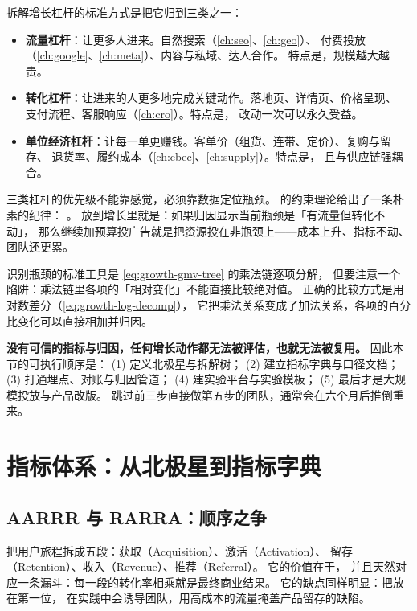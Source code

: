 拆解增长杠杆的标准方式是把它归到三类之一：

\begin{itemize}
  \item \textbf{流量杠杆}：让更多人进来。自然搜索（\cref{ch:seo}、\cref{ch:geo}）、
        付费投放（\cref{ch:google}、\cref{ch:meta}）、内容与私域、达人合作。
        特点是，规模越大越贵。
  \item \textbf{转化杠杆}：让进来的人更多地完成关键动作。落地页、详情页、价格呈现、
        支付流程、客服响应（\cref{ch:cro}）。特点是，
        改动一次可以永久受益。
  \item \textbf{单位经济杠杆}：让每一单更赚钱。客单价（组货、连带、定价）、复购与留存、
        退货率、履约成本（\cref{ch:cbec}、\cref{ch:supply}）。特点是，
        且与供应链强耦合。
\end{itemize}

三类杠杆的优先级不能靠感觉，必须靠数据定位瓶颈。
\cite{goldratt2004goal} 的约束理论给出了一条朴素的纪律：
。
放到增长里就是：如果归因显示当前瓶颈是「有流量但转化不动」，
那么继续加预算投广告就是把资源投在非瓶颈上——成本上升、指标不动、团队还更累。

识别瓶颈的标准工具是 \cref{eq:growth-gmv-tree} 的乘法链逐项分解，
但要注意一个陷阱：乘法链里各项的「相对变化」不能直接比较绝对值。
正确的比较方式是用对数差分（\cref{eq:growth-log-decomp}），
它把乘法关系变成了加法关系，各项的百分比变化可以直接相加并归因。

\begin{keypoint}
\textbf{没有可信的指标与归因，任何增长动作都无法被评估，也就无法被复用。}
因此本节的可执行顺序是：
(1) 定义北极星与拆解树；
(2) 建立指标字典与口径文档；
(3) 打通埋点、对账与归因管道；
(4) 建实验平台与实验模板；
(5) 最后才是大规模投放与产品改版。
跳过前三步直接做第五步的团队，通常会在六个月后推倒重来。
\end{keypoint}

\section{指标体系：从北极星到指标字典}

\subsection{AARRR 与 RARRA：顺序之争}

 把用户旅程拆成五段：获取（Acquisition）、激活（Activation）、
留存（Retention）、收入（Revenue）、推荐（Referral）。
它的价值在于，
并且天然对应一条漏斗：每一段的转化率相乘就是最终商业结果。
它的缺点同样明显：把放在第一位，
在实践中会诱导团队，用高成本的流量掩盖产品留存的缺陷。

